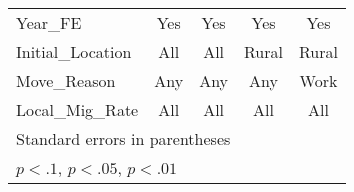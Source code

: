 \begin{table}[htbp]
\begin{tabular}{l*{4}{c}}
Year\_FE             &         Yes         &         Yes         &         Yes         &         Yes         \\
Initial\_Location    &         All         &         All         &       Rural         &       Rural         \\
Move\_Reason         &         Any         &         Any         &         Any         &        Work         \\
Local\_Mig\_Rate      &         All         &         All         &         All         &         All         \\
\bottomrule
\multicolumn{5}{l}{\footnotesize Standard errors in parentheses}\\
\multicolumn{5}{l}{\footnotesize \sym{*} \(p<.1\), \sym{**} \(p<.05\), \sym{***} \(p<.01\)}\\
\end{tabular}
\end{table}
